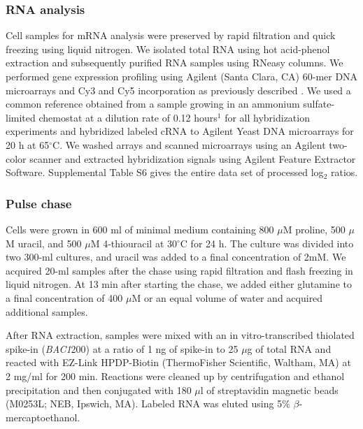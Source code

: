 \subsubsection{RNA analysis} 

Cell samples for
mRNA analysis were preserved by rapid filtration and quick freezing
using liquid nitrogen. We isolated total RNA using hot acid-phenol
extraction and subsequently purified RNA samples using RNeasy columns.
We performed gene expression profiling using Agilent (Santa Clara, CA)
60-mer DNA microarrays and Cy3 and Cy5 incorporation as previously
described 
\parencite{brauer2008coordination}. We used a common reference obtained
from a sample growing in an ammonium sulfate-limited chemostat at a
dilution rate of 0.12 hours$^1$ for all hybridization experiments and
hybridized labeled cRNA to Agilent Yeast DNA microarrays for 20 h at
65$^{\circ}$C. We washed arrays and scanned microarrays using an Agilent
two-color scanner and extracted hybridization signals using Agilent
Feature Extractor Software. Supplemental Table S6 gives the entire
data set of processed log$_2$ ratios.  

\subsubsection{Pulse chase} 

Cells were grown in
600 ml of minimal medium containing 800 $\mu$M proline, 500 $\mu$M uracil, and
500 $\mu$M 4-thiouracil at 30$^{\circ}$C for 24 h. The culture was divided into two
300-ml cultures, and uracil was added to a final concentration of 2mM. 
We acquired 20-ml samples after the chase using rapid filtration
and flash freezing in liquid nitrogen. At 13 min after starting the
chase, we added either glutamine to a final concentration of 400 $\mu$M or
an equal volume of water and acquired additional samples.  

After RNA
extraction, samples were mixed with an in vitro-transcribed thiolated
spike-in (\textit{BAC1}200) at a ratio of 1 ng of spike-in to 25 $\mu$g of total
RNA and reacted with EZ-Link HPDP-Biotin (ThermoFisher Scientific,
Waltham, MA) at 2 mg/ml for 200 min. Reactions were cleaned up by
centrifugation and ethanol precipitation and then conjugated with 180
$\mu$l of streptavidin magnetic beads (M0253L; NEB, Ipswich, MA). Labeled
RNA was eluted using 5\% $\beta$-mercaptoethanol.  

